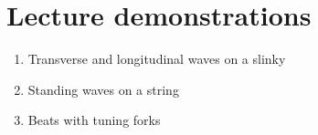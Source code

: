 \section{Lecture demonstrations}

\begin{enumerate}

\item Transverse and longitudinal waves on a slinky

\item Standing waves on a string

\item Beats with tuning forks

\end{enumerate}

